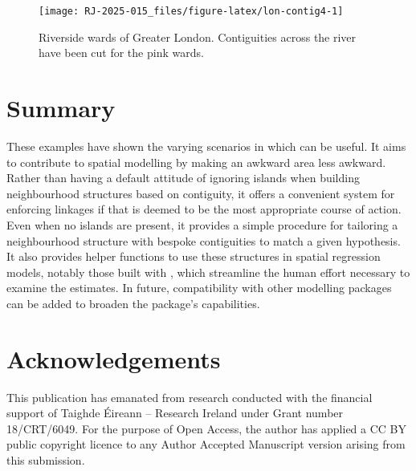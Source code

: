 \begin{figure}

{\centering \texttt{[image: RJ-2025-015\_files/figure-latex/lon-contig4-1]} 

}

\caption{Riverside wards of Greater London. Contiguities across the river have been cut for the pink wards. }\label{fig:lon-contig4}
\end{figure}

\section{Summary}\label{summary}

These examples have shown the varying scenarios in which  can be useful. It aims to contribute to spatial modelling by making an awkward area less awkward. Rather than having a default attitude of ignoring islands when building neighbourhood structures based on contiguity, it offers a convenient system for enforcing linkages if that is deemed to be the most appropriate course of action. Even when no islands are present, it provides a simple procedure for tailoring a neighbourhood structure with bespoke contiguities to match a given hypothesis. It also provides helper functions to use these structures in spatial regression models, notably those built with , which streamline the human effort necessary to examine the estimates. In future, compatibility with other modelling packages can be added to broaden the package's capabilities.

\section{Acknowledgements}\label{acknowledgements}

This publication has emanated from research conducted with the financial support of Taighde Éireann -- Research Ireland under Grant number 18/CRT/6049. For the purpose of Open Access, the author has applied a CC BY public copyright licence to any Author Accepted Manuscript version arising from this submission.



\address{%
Kevin Horan\\
Hamilton Institute, Maynooth University\\%
Maynooth\\ Co.~Kildare, Ireland\\
%
\url{https://github.com/horankev}\\%
\textit{ORCiD: \href{https://orcid.org/0009-0003-9378-0084}{0009-0003-9378-0084}}\\%
\href{mailto:kevin.horan.2021@mumail.ie}{\nolinkurl{kevin.horan.2021@mumail.ie}}%
}

